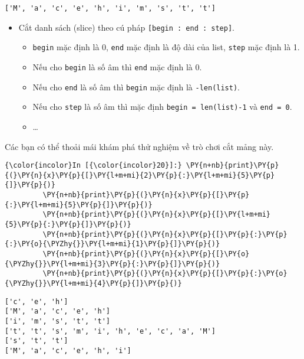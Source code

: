     \begin{Verbatim}[commandchars=\\\{\}]
['M', 'a', 'c', 'e', 'h', 'i', 'm', 's', 't', 't']

    \end{Verbatim}

    \begin{itemize}
\tightlist
\item
  Cắt danh sách (slice) theo cú pháp
  \texttt{{[}begin\ :\ end\ :\ step{]}}.

  \begin{itemize}
  \tightlist
  \item
    \texttt{begin} mặc định là 0, \texttt{end} mặc định là độ dài của
    list, \texttt{step} mặc định là 1.
  \item
    Nếu cho \texttt{begin} là số âm thì \texttt{end} mặc định là 0.
  \item
    Nếu cho \texttt{end} là số âm thì \texttt{begin} mặc định là
    \texttt{-len(list)}.
  \item
    Nếu cho \texttt{step} là số âm thì mặc định
    \texttt{begin\ =\ len(list)-1} và \texttt{end\ =\ 0}.
  \item
    \ldots{}
  \end{itemize}
\end{itemize}

Các bạn có thể thoải mái khám phá thử nghiệm về trò chơi cắt mảng này.

    
\begin{Verbatim}[commandchars=\\\{\}]
{\color{incolor}In [{\color{incolor}20}]:} \PY{n+nb}{print}\PY{p}{(}\PY{n}{x}\PY{p}{[}\PY{l+m+mi}{2}\PY{p}{:}\PY{l+m+mi}{5}\PY{p}{]}\PY{p}{)}
         \PY{n+nb}{print}\PY{p}{(}\PY{n}{x}\PY{p}{[}\PY{p}{:}\PY{l+m+mi}{5}\PY{p}{]}\PY{p}{)}
         \PY{n+nb}{print}\PY{p}{(}\PY{n}{x}\PY{p}{[}\PY{l+m+mi}{5}\PY{p}{:}\PY{p}{]}\PY{p}{)}
         \PY{n+nb}{print}\PY{p}{(}\PY{n}{x}\PY{p}{[}\PY{p}{:}\PY{p}{:}\PY{o}{\PYZhy{}}\PY{l+m+mi}{1}\PY{p}{]}\PY{p}{)}
         \PY{n+nb}{print}\PY{p}{(}\PY{n}{x}\PY{p}{[}\PY{o}{\PYZhy{}}\PY{l+m+mi}{3}\PY{p}{:}\PY{p}{]}\PY{p}{)}
         \PY{n+nb}{print}\PY{p}{(}\PY{n}{x}\PY{p}{[}\PY{p}{:}\PY{o}{\PYZhy{}}\PY{l+m+mi}{4}\PY{p}{]}\PY{p}{)}
\end{Verbatim}
    

    \begin{Verbatim}[commandchars=\\\{\}]
['c', 'e', 'h']
['M', 'a', 'c', 'e', 'h']
['i', 'm', 's', 't', 't']
['t', 't', 's', 'm', 'i', 'h', 'e', 'c', 'a', 'M']
['s', 't', 't']
['M', 'a', 'c', 'e', 'h', 'i']

    \end{Verbatim}

